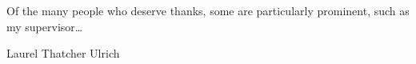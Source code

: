 \begin{acknowledgements}
  Of the many people who deserve thanks, some are particularly prominent,
  such as my supervisor\dots
\end{acknowledgements}




\tableofcontents
\listoffigures
\listoftables

%
  {Laurel Thatcher Ulrich}
\thispagestyle{empty}
